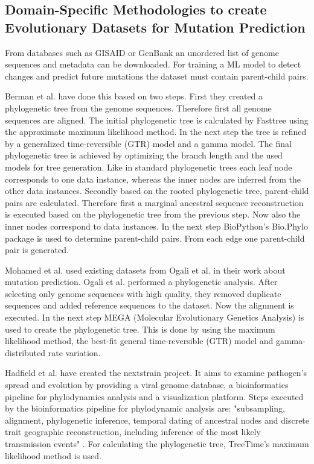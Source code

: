 \subsection{Domain-Specific Methodologies to create Evo\-lu\-tio\-na\-ry Datasets for Mutation Prediction} \label{fundamentalsC}

From databases such as \ac{GISAID} or GenBank an unordered list of genome sequences and metadata can be downloaded. For training a \ac{ML} model to detect changes and predict future mutations the dataset must contain parent-child pairs.

Berman et al. \cite{Berman2020} have done this based on two steps. First they created a phylogenetic tree from the genome sequences. Therefore first all genome sequences are aligned. The initial phylogenetic tree is calculated by Fasttree using the approximate maximum likelihood method. In the next step the tree is refined by a generalized time-reversible (GTR) model and a gamma model. The final phylogenetic tree is achieved by optimizing the branch length and the used models for tree generation. Like in standard phylogenetic trees each leaf node corresponds to one data instance, whereas the inner nodes are inferred from the other data instances.
Secondly based on the rooted phylogenetic tree, parent-child pairs are calculated. Therefore first a marginal ancestral sequence reconstruction is executed based on the phylogenetic tree from the previous step. Now also the inner nodes correspond to data instances. In the next step BioPython's \cite{10.1093/bioinformatics/btp163} Bio.Phylo package is used to determine parent-child pairs. From each edge one parent-child pair is generated. \cite{Berman2020}

Mohamed et al. \cite{Mohamed2021} used existing datasets from Ogali et al. \cite{ogaliMolecularCharacterizationNewcastle2018} in their work about mutation prediction. Ogali et al. \cite{ogaliMolecularCharacterizationNewcastle2018} performed a phylogenetic analysis. After selecting only genome sequences with high quality, they removed duplicate sequences and added reference sequences to the dataset. Now the alignment is executed. In the next step MEGA (Molecular Evo\-lu\-tio\-na\-ry Genetics Analysis) is used to create the phylogenetic tree. This is done by using the maximum likelihood method, the best-fit general time-reversible (GTR) model and gamma-distributed rate variation.

Hadfield et al. \cite{10.1093/bioinformatics/bty407} have created the nextstrain project. It aims to examine pathogen's spread and evolution by providing a viral genome database, a bioinformatics pipeline for phylodynamics analysis and a visualization plat\-form. 
Steps executed by the bioinformatics pipeline for phylodynamic analysis are: "subsampling, alignment, phylogenetic inference, temporal dating of ancestral nodes and discrete trait geographic reconstruction, including in\-fe\-rence of the most likely transmission events" \cite{10.1093/bioinformatics/bty407}. For calculating the phylogenetic tree, TreeTime's maximum likelihood method is used. \cite{10.1093/bioinformatics/bty407}



